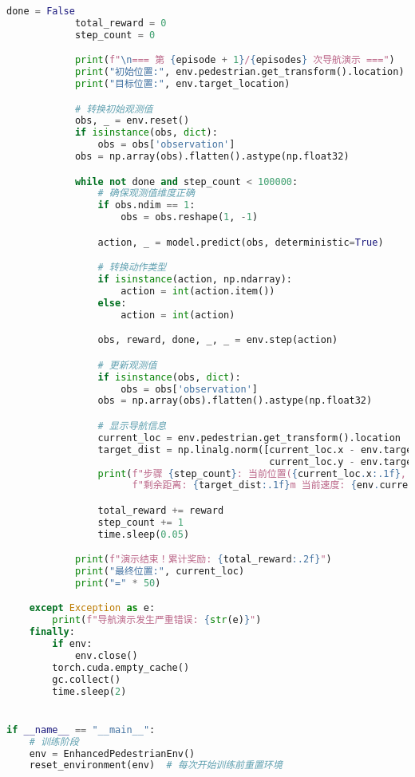 \begin{lstlisting}[language=Python]
            done = False
            total_reward = 0
            step_count = 0

            print(f"\n=== 第 {episode + 1}/{episodes} 次导航演示 ===")
            print("初始位置:", env.pedestrian.get_transform().location)
            print("目标位置:", env.target_location)

            # 转换初始观测值
            obs, _ = env.reset()
            if isinstance(obs, dict):
                obs = obs['observation']
            obs = np.array(obs).flatten().astype(np.float32)

            while not done and step_count < 100000:
                # 确保观测值维度正确
                if obs.ndim == 1:
                    obs = obs.reshape(1, -1)

                action, _ = model.predict(obs, deterministic=True)

                # 转换动作类型
                if isinstance(action, np.ndarray):
                    action = int(action.item())
                else:
                    action = int(action)

                obs, reward, done, _, _ = env.step(action)

                # 更新观测值
                if isinstance(obs, dict):
                    obs = obs['observation']
                obs = np.array(obs).flatten().astype(np.float32)

                # 显示导航信息
                current_loc = env.pedestrian.get_transform().location
                target_dist = np.linalg.norm([current_loc.x - env.target_location.x,
                                              current_loc.y - env.target_location.y])
                print(f"步骤 {step_count}: 当前位置({current_loc.x:.1f}, {current_loc.y:.1f}) "
                      f"剩余距离: {target_dist:.1f}m 当前速度: {env.current_speed:.1f}m/s 当前奖励: {reward:.2f}")

                total_reward += reward
                step_count += 1
                time.sleep(0.05)

            print(f"演示结束！累计奖励: {total_reward:.2f}")
            print("最终位置:", current_loc)
            print("=" * 50)

    except Exception as e:
        print(f"导航演示发生严重错误: {str(e)}")
    finally:
        if env:
            env.close()
        torch.cuda.empty_cache()
        gc.collect()
        time.sleep(2)


if __name__ == "__main__":
    # 训练阶段
    env = EnhancedPedestrianEnv()
    reset_environment(env)  # 每次开始训练前重置环境


\end{lstlisting}
